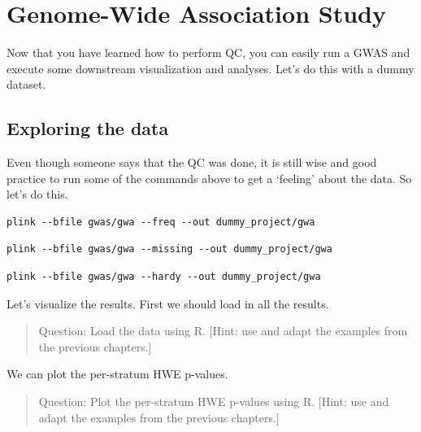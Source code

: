 \documentclass[
]{book}
\begin{document}
\hypertarget{gwas_testing}{%
\chapter{Genome-Wide Association Study}\label{gwas_testing}}

Now that you have learned how to perform QC, you can easily run a GWAS and execute some downstream visualization and analyses. Let's do this with a dummy dataset.

\hypertarget{exploring-the-data}{%
\section{Exploring the data}\label{exploring-the-data}}

Even though someone says that the QC was done, it is still wise and good practice to run some of the commands above to get a `feeling' about the data. So let's do this.

\begin{lstlisting}
plink --bfile gwas/gwa --freq --out dummy_project/gwa
\end{lstlisting}

\begin{lstlisting}
plink --bfile gwas/gwa --missing --out dummy_project/gwa
\end{lstlisting}

\begin{lstlisting}
plink --bfile gwas/gwa --hardy --out dummy_project/gwa
\end{lstlisting}

Let's visualize the results. First we should load in all the results.

\begin{quote}
Question: Load the data using R. {[}Hint: use and adapt the examples from the previous chapters.{]}
\end{quote}

We can plot the per-stratum HWE p-values.

\begin{quote}
Question: Plot the per-stratum HWE p-values using R. {[}Hint: use and adapt the examples from the previous chapters.{]}
\end{quote}
\end{document}

